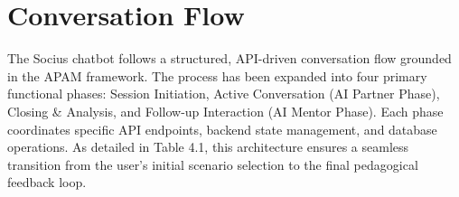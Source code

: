 

    \section{Conversation Flow}
    The Socius chatbot follows a structured, API-driven conversation flow grounded in the APAM framework. The process has been expanded into four primary functional phases: Session Initiation, Active Conversation (AI Partner Phase), Closing \& Analysis, and Follow-up Interaction (AI Mentor Phase). Each phase coordinates specific API endpoints, backend state management, and database operations. As detailed in Table 4.1, this architecture ensures a seamless transition from the user's initial scenario selection to the final pedagogical feedback loop.
    

